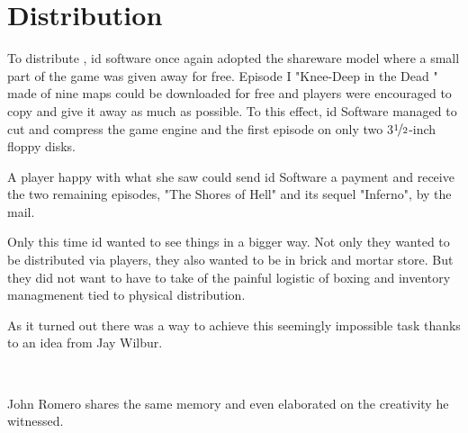 \section{Distribution}
To distribute \doom, id software once again adopted the shareware model where a small part of the game was given away for free. Episode I "Knee-Deep in the Dead " made of nine maps could be downloaded for free and players were encouraged to copy and give it away as much as possible. To this effect, id Software managed to cut and compress the game engine and the first episode on only two 3$\nicefrac{1}{2}$-inch floppy disks.\\
\par 
A player happy with what she saw could send id Software a payment and receive the two remaining episodes, "The Shores of Hell" and its sequel "Inferno", by the mail.\\
\par
{}
\par
Only this time id wanted to see things in a bigger way. Not only they wanted to be distributed via players, they also wanted to be in brick and mortar store. But they did not want to have to take of the painful logistic of boxing and inventory managmenent tied to physical distribution.\\
\par
 As it turned out there was a way to achieve this seemingly impossible task thanks to an idea from Jay Wilbur.\\
\par
{}\\
\par
John Romero shares the same memory and even elaborated on the creativity he witnessed.\\
